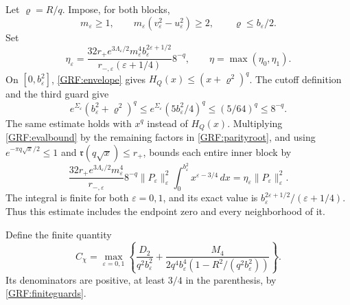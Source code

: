 \documentclass[11pt,a4paper]{article}
\begin{document}
Let $\varrho=R/q$. Impose, for both blocks,
\begin{equation*}\tag{GRF16}\label{GRF:finiteguards}
 m_\varepsilon\ge1,\qquad
 m_\varepsilon(v_\varepsilon^2-u_\varepsilon^2)\ge2,
 \qquad \varrho\le b_\varepsilon/2.
\end{equation*}
Set
\begin{equation*}\tag{GRF17}\label{GRF:eta}
 \eta_\varepsilon=
 \frac{32r_+e^{3\Lambda_\varepsilon/2}m_\varepsilon^4
                b_\varepsilon^{2\varepsilon+1/2}}
 {r_{-,\varepsilon}(\varepsilon+1/4)}8^{-q},
 \qquad \eta=\max(\eta_0,\eta_1).
\end{equation*}
On $[0,b_\varepsilon^2]$, \eqref{GRF:envelope} gives
$H_Q(x)\le(x+\varrho^2)^q$. The cutoff definition and the third guard give
\[
 e^{\Sigma_\varepsilon}(b_\varepsilon^2+\varrho^2)^q
 \le e^{\Sigma_\varepsilon}(5b_\varepsilon^2/4)^q
 \le (5/64)^q\le8^{-q}.
\]
The same estimate holds with $x^q$ instead of $H_Q(x)$.
Multiplying \eqref{GRF:evalbound} by the remaining factors in
\eqref{GRF:parityroot}, and using $e^{-\pi q\sqrt x/2}\le1$ and
$\mathfrak r(q\sqrt x)\le r_+$, bounds each entire inner block by
\[
 \frac{32r_+e^{3\Lambda_\varepsilon/2}m_\varepsilon^4}
      {r_{-,\varepsilon}}8^{-q}\|P_\varepsilon\|_\varepsilon^2
 \int_0^{b_\varepsilon^2}x^{\varepsilon-3/4}\,d x
 =\eta_\varepsilon\|P_\varepsilon\|_\varepsilon^2.
\]
The integral is finite for both $\varepsilon=0,1$, and its exact value is
$b_\varepsilon^{2\varepsilon+1/2}/(\varepsilon+1/4)$.
Thus this estimate includes the endpoint zero and every neighborhood of it.

Define the finite quantity
\begin{equation*}\tag{GRF18}\label{GRF:Cchi}
 C_\chi=\max_{\varepsilon=0,1}
 \left\{\frac{D_2}{q^2b_\varepsilon^2}
 +\frac{M_4}{2q^4b_\varepsilon^4
             (1-R^2/(q^2b_\varepsilon^2))}\right\}.
\end{equation*}
Its denominators are positive, at least $3/4$ in the parenthesis,
by \eqref{GRF:finiteguards}.
\end{document}
